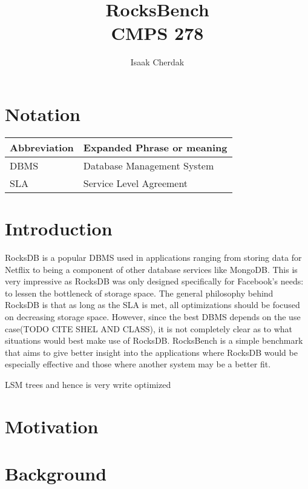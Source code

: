 \documentclass{article}
\title{RocksBench\\CMPS 278}
\author{Isaak Cherdak}
\begin{document}
\maketitle

\pagebreak

\section*{Notation}

\begin{center}
  \begin{tabular}{ | l | l | }
    \hline
    Abbreviation & Expanded Phrase or meaning\\ \hline \hline
    DBMS & Database Management System\\ \hline
    SLA & Service Level Agreement\\ \hline
  \end{tabular}
\end{center}

\section{Introduction}
\label{sec:overview}

RocksDB is a popular DBMS used in applications ranging from storing data for
Netflix to being a component of other database services like MongoDB. This is
very impressive as RocksDB was only designed specifically for Facebook's needs:
to lessen the bottleneck of storage space. The general philosophy behind RocksDB
is that as long as the SLA is met, all optimizations should be focused on
decreasing storage space. However, since the best DBMS depends on the use
case(TODO CITE SHEL AND CLASS), it is not completely clear as to what situations
would best make use of RocksDB. RocksBench is a simple benchmark that aims to
give better insight into the applications where RocksDB would be especially
effective and those where another system may be a better fit.


LSM trees and hence is very write optimized

\section{Motivation}


\section{Background}
\label{sec:background}
\end{document}
